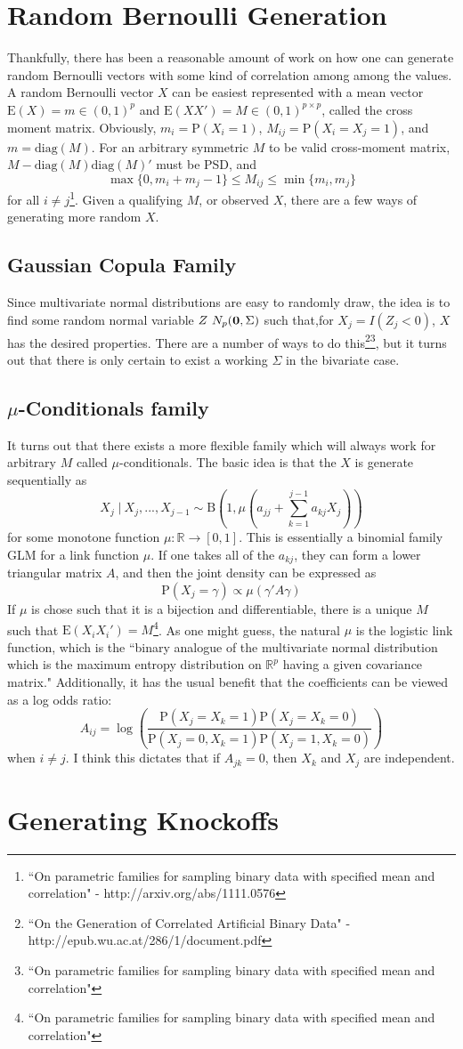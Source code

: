 \documentclass[11pt]{article}
\newcommand{\R}{\mathbb{R}}
\newcommand{\p}{\mathrm{P}}
\newcommand{\E}{\mathrm{E}}
\newcommand{\diag}{\mathrm{diag}}
\newcommand{\st}{ \; \big | \:}
\theoremstyle{definition}
\begin{document}
\section{Random Bernoulli Generation}
Thankfully, there has been a reasonable amount of work on how one can generate random Bernoulli vectors with some kind of correlation among among the values. A random Bernoulli vector $X$ can be easiest represented with a mean vector $\E(X)=m\in(0,1)^p$ and $\E(XX')=M\in(0,1)^{p\times p}$, called the cross moment matrix. Obviously, $m_i = \p(X_i=1)$, $M_{ij} = \p(X_i=X_j=1)$, and $m=\diag(M)$. For an arbitrary symmetric $M$ to be valid cross-moment matrix, $M-\diag(M)\diag(M)'$ must be PSD, and
\[ \max\{0,m_i+m_j -1\} \leq M_{ij} \leq \min\{m_i,m_j\}\]
for all $i\neq j$\footnote{``On parametric families for sampling binary data with specified mean and correlation" - http://arxiv.org/abs/1111.0576}. Given a qualifying $M$, or observed $X$, there are a few ways of generating more random $X$.

\subsection{Gaussian Copula Family}
Since multivariate normal distributions are easy to randomly draw, the idea is to find some random normal variable $Z~N_p({\bf 0},\Sigma)$ such that,for $X_j = I(Z_j<0)$, $X$ has the desired properties. There are a number of ways to do this\footnote{``On the Generation of Correlated Artificial Binary Data" - http://epub.wu.ac.at/286/1/document.pdf}\footnote{``On parametric families for sampling binary data with specified mean and correlation"}, but it turns out that there is only certain to exist a working $\Sigma$ in the bivariate case. 

\subsection{$\mu$-Conditionals family}
It turns out that there exists a more flexible family which will always work for arbitrary $M$ called $\mu$-conditionals. The basic idea is that the $X$ is generate sequentially as 
\[ X_{j}\st X_{j},...,X_{j-1} \sim \mathrm{B}\left(1,\mu\left(a_{jj}+\sum_{k=1}^{j-1}a_{kj}X_j\right)\right) \]
for some monotone function $\mu:\R\to[0,1]$. This is essentially a binomial family GLM for a link function $\mu$. If one takes all of the $a_{kj}$, they can form a lower triangular matrix $A$, and then the joint density can be expressed as 
\[ \p(X_j=\gamma) \propto \mu(\gamma'A\gamma)\]
If $\mu$ is chose such that it is a bijection and differentiable, there is a unique $M$ such that $\E(X_iX_i')=M$\footnote{``On parametric families for sampling binary data with specified mean and correlation"}. As one might guess, the natural $\mu$ is the logistic link function, which is the ``binary analogue of the multivariate normal distribution which is the maximum entropy distribution on $\R^p$ having a given covariance matrix." Additionally, it has the usual benefit that the coefficients can be viewed as a log odds ratio:
\[A_{ij} = \log\left(\frac{\p(X_j=X_k=1)\p(X_j=X_k=0)}{\p(X_j=0,X_k=1)\p(X_j=1,X_k=0)}\right) \]
when $i\neq j$. I think this dictates that if $A_{jk}=0$, then $X_k$ and $X_j$ are independent. 

\section{Generating Knockoffs}
\end{document}
